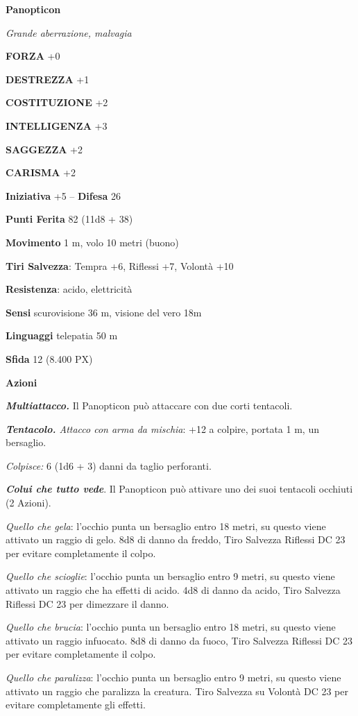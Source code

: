\begin{multicols}{2}
\medskip{}\textbf{Panopticon}

\textit{Grande aberrazione, malvagia}

\textbf{FORZA} +0

\textbf{DESTREZZA} +1

\textbf{COSTITUZIONE} +2

\textbf{INTELLIGENZA} +3

\textbf{SAGGEZZA} +2

\textbf{CARISMA} +2

\textbf{Iniziativa} +5 -- \textbf{Difesa} 26

\textbf{Punti Ferita} 82 (11d8 + 38)

\textbf{Movimento} 1 m, volo 10 metri (buono)

\textbf{Tiri Salvezza}: Tempra +6, Riflessi +7, Volontà +10

\textbf{Resistenza}: acido, elettricità

\textbf{Sensi} scurovisione 36 m, visione del vero 18m

\textbf{Linguaggi} telepatia 50 m

\textbf{Sfida} 12 (8.400 PX)

\textbf{Azioni}

\textit{\textbf{Multiattacco.}} Il Panopticon può attaccare con due corti tentacoli.

\textit{\textbf{Tentacolo.} Attacco con arma da mischia}: +12 a colpire, portata 1 m, un bersaglio.

\textit{Colpisce:} 6 (1d6 + 3) danni da taglio perforanti.

\textit{\textbf{Colui che tutto vede}}. Il Panopticon può attivare uno dei suoi tentacoli occhiuti (2 Azioni).

\textit{Quello che gela}: l'occhio punta un bersaglio entro 18 metri, su questo viene attivato un raggio di gelo. 8d8 di danno da freddo, Tiro Salvezza Riflessi DC 23 per evitare completamente il colpo.

\textit{Quello che scioglie}: l'occhio punta un bersaglio entro 9 metri, su questo viene attivato un raggio che ha effetti di acido. 4d8 di danno da acido, Tiro Salvezza Riflessi DC 23 per dimezzare il danno.

\textit{Quello che brucia}: l'occhio punta un bersaglio entro 18 metri, su questo viene attivato un raggio infuocato. 8d8 di danno da fuoco, Tiro Salvezza Riflessi DC 23 per evitare completamente il colpo.

\textit{Quello che paralizza}: l'occhio punta un bersaglio entro 9 metri, su questo viene attivato un raggio che paralizza la creatura. Tiro Salvezza su Volontà DC 23 per evitare completamente gli effetti.


\end{multicols}
